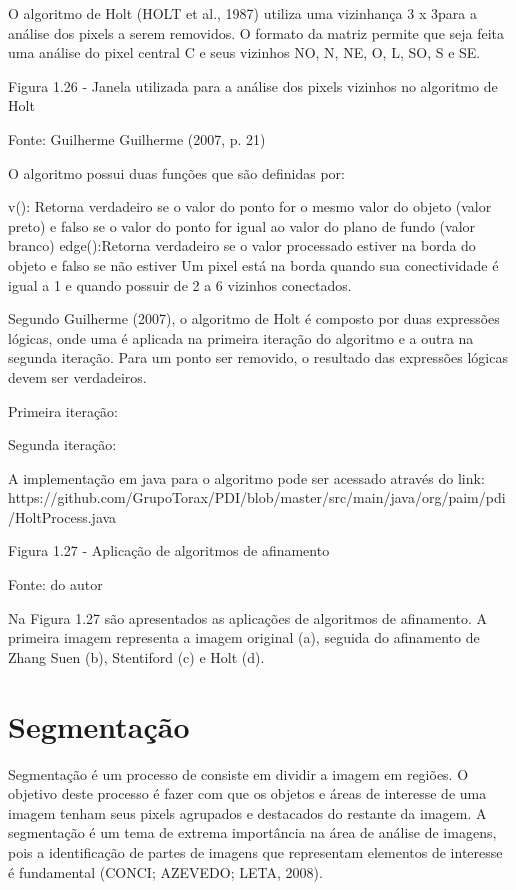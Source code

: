 \documentclass[
	12pt,				%
	oneside,			%
	a4paper,			%
	english,			%
	french,				%
	spanish,			%
	brazil,				%
	]{abntex2}
\begin{document}
O algoritmo de Holt (HOLT et al., 1987) utiliza uma vizinhança 3 x 3para a análise dos pixels a serem removidos. O formato da matriz permite que seja feita uma análise do pixel central C e seus vizinhos NO, N, NE, O, L, SO, S e SE.

Figura 1.26 - Janela utilizada para a análise dos pixels vizinhos no algoritmo de Holt

Fonte: Guilherme Guilherme (2007, p. 21)

O algoritmo possui duas funções que são definidas por:

v(): Retorna verdadeiro se o valor do ponto for o mesmo valor do objeto (valor preto) e falso se o valor do ponto for igual ao valor do plano de fundo (valor branco)
edge():Retorna verdadeiro se o valor processado estiver na borda do objeto e falso se não estiver
Um pixel está na borda quando sua conectividade é igual a 1 e quando possuir de 2 a 6 vizinhos conectados. 

Segundo Guilherme (2007), o algoritmo de Holt é composto por duas expressões lógicas, onde uma é aplicada na primeira iteração do algoritmo e a outra na segunda iteração. Para um ponto ser removido, o resultado das expressões lógicas devem ser verdadeiros.

Primeira iteração: 

 Segunda iteração:

A implementação em java para o algoritmo pode ser acessado através do link:
https://github.com/GrupoTorax/PDI/blob/master/src/main/java/org/paim/pdi/HoltProcess.java 

Figura 1.27 - Aplicação de algoritmos de afinamento

Fonte: do autor

Na Figura 1.27 são apresentados as aplicações de algoritmos de afinamento. A primeira imagem representa a imagem original (a), seguida do afinamento de Zhang Suen (b), Stentiford (c) e Holt (d). 
   
\section{Segmentação}  

Segmentação é um processo de consiste em dividir a imagem em regiões. O objetivo deste processo é fazer com que os objetos e áreas de interesse de uma imagem tenham seus pixels agrupados e destacados do restante da imagem. A segmentação é um tema de extrema importância na área de análise de imagens, pois a identificação de partes de imagens que representam elementos de interesse é fundamental (CONCI; AZEVEDO; LETA, 2008).  
\end{document}
